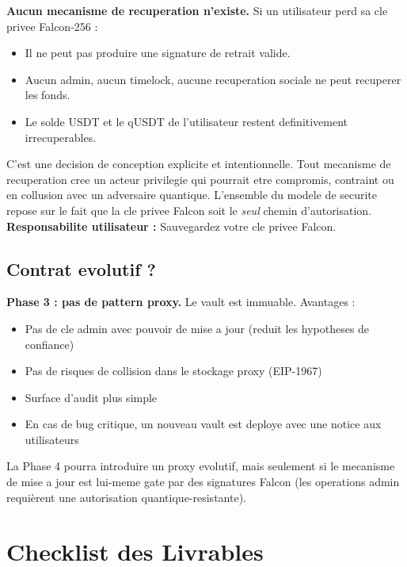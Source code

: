 \documentclass[11pt,a4paper]{article}
\begin{document}
\textbf{Aucun mecanisme de recuperation n'existe.} Si un utilisateur perd sa cle privee Falcon-256 :

\begin{warningbox}
\begin{itemize}
  \item Il ne peut pas produire une signature de retrait valide.
  \item Aucun admin, aucun timelock, aucune recuperation sociale ne peut recuperer les fonds.
  \item Le solde USDT et le qUSDT de l'utilisateur restent definitivement irrecuperables.
\end{itemize}
C'est une decision de conception explicite et intentionnelle. Tout mecanisme de recuperation
cree un acteur privilegie qui pourrait etre compromis, contraint ou en collusion avec un
adversaire quantique. L'ensemble du modele de securite repose sur le fait que la cle privee
Falcon soit le \textit{seul} chemin d'autorisation.\\[4pt]
\textbf{Responsabilite utilisateur :} Sauvegardez votre cle privee Falcon.
\end{warningbox}

\subsection{Contrat evolutif ?}

\textbf{Phase 3 : pas de pattern proxy.} Le vault est immuable. Avantages :
\begin{itemize}
  \item Pas de cle admin avec pouvoir de mise a jour (reduit les hypotheses de confiance)
  \item Pas de risques de collision dans le stockage proxy (EIP-1967)
  \item Surface d'audit plus simple
  \item En cas de bug critique, un nouveau vault est deploye avec une notice aux utilisateurs
\end{itemize}

La Phase 4 pourra introduire un proxy evolutif, mais seulement si le mecanisme de mise a
jour est lui-meme gate par des signatures Falcon (les operations admin requi\`erent une
autorisation quantique-resistante).

\section{Checklist des Livrables}
\end{document}
